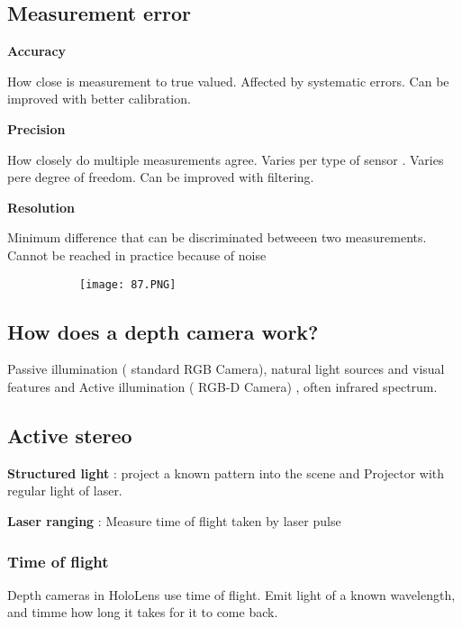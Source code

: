 \documentclass{article}
\begin{document}
\subsection{Measurement error}

\textbf{Accuracy}
\vspace{3mm}

How close is measurement to true valued. Affected by systematic errors. Can be improved with better calibration.

\textbf{Precision}
\vspace{3mm}

How closely do multiple measurements agree. Varies per type of sensor . Varies pere degree of freedom. Can be improved with filtering.

\textbf{Resolution}
\vspace{3mm}

Minimum difference that can be discriminated betweeen two measurements. Cannot be reached in practice because of noise

\begin{figure}[ht!]
  \centering
  \begin{subfigure}[b]{0.4\linewidth}
    \texttt{[image: 87.PNG]}
  \end{subfigure}
\end{figure}

\subsection{How does a depth camera work?}

Passive illumination ( standard RGB Camera), natural light sources and visual features and Active illumination ( RGB-D Camera) , often infrared spectrum.

\subsection{Active stereo}

\textbf{Structured light} : project a known pattern into the scene and Projector with regular light of laser.

\textbf{Laser ranging} : Measure time of flight taken by laser pulse

\subsubsection{Time of flight}

Depth cameras in HoloLens use time of flight. Emit light of a known wavelength, and timme how long it takes for it to come back.
\end{document}

